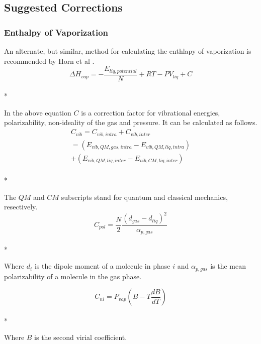\documentclass[9pt,bestpractices]{livecoms}
\begin{document}


\subsection{Suggested Corrections}
\subsubsection{Enthalpy of Vaporization}
An alternate, but similar, method for calculating the enthlapy of vaporization is recommended by Horn et al \cite{horn}.
\begin{equation}\Delta H_{vap} = -\frac{E_{liq, potential}}{N} + R T - P V_{liq} + C\end{equation}\\*

In the above equation $C$ is a correction factor for vibrational energies, polarizability, non-ideality of the gas and pressure. It can be calculated as follows.
\begin{multline}
C_{vib} = C_{vib,intra} + C_{vib,inter} \\ = \left(E_{vib,QM,gas,intra} - E_{vib,QM,liq,intra}\right) \\ + \left(E_{vib,QM,liq,inter} - E_{vib,CM,liq,inter}\right)
\end{multline}\\*

The $QM$ and $CM$ subscripts stand for quantum and classical mechanics, resectively. 
\begin{equation}C_{pol} = \frac{N}{2} \frac{\left(d_{gas} - d_{liq}\right)^2}{\alpha_{p,gas}}\end{equation}\\*

Where $d_i$ is the dipole moment of a molecule in phase $i$ and $\alpha_{p,gas}$ is the mean polarizability of a molecule in the gas phase.

\begin{equation}C_{ni} = P_{vap} \left(B - T \frac{dB}{dT}\right)\end{equation}\\*

Where $B$ is the second virial coefficient.
\end{document}
